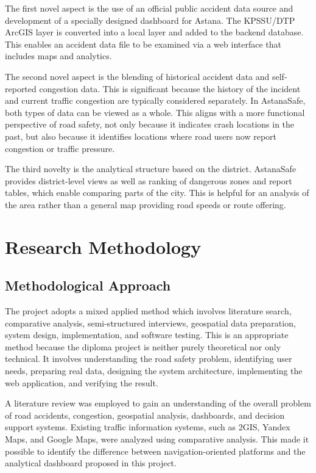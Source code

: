 ﻿\documentclass[12pt,a4paper]{report}
\begin{document}
The first novel aspect is the use of an official public accident data source and development of a specially designed dashboard for Astana. The KPSSU/DTP ArcGIS layer is converted into a local layer and added to the backend database. This enables an accident data file to be examined via a web interface that includes maps and analytics.

The second novel aspect is the blending of historical accident data and self-reported congestion data. This is significant because the history of the incident and current traffic congestion are typically considered separately. In AstanaSafe, both types of data can be viewed as a whole. This aligns with a more functional perspective of road safety, not only because it indicates crash locations in the past, but also because it identifies locations where road users now report congestion or traffic pressure.

The third novelty is the analytical structure based on the district. AstanaSafe provides district-level views as well as ranking of dangerous zones and report tables, which enable comparing parts of the city. This is helpful for an analysis of the area rather than a general map providing road speeds or route offering.

\section{Research Methodology}
\label{sec:methodology}

\subsection{Methodological Approach}

The project adopts a mixed applied method which involves literature search, comparative analysis, semi-structured interviews, geospatial data preparation, system design, implementation, and software testing. This is an appropriate method because the diploma project is neither purely theoretical nor only technical. It involves understanding the road safety problem, identifying user needs, preparing real data, designing the system architecture, implementing the web application, and verifying the result.

A literature review was employed to gain an understanding of the overall problem of road accidents, congestion, geospatial analysis, dashboards, and decision support systems. Existing traffic information systems, such as 2GIS, Yandex Maps, and Google Maps, were analyzed using comparative analysis. This made it possible to identify the difference between navigation-oriented platforms and the analytical dashboard proposed in this project.
\end{document}
